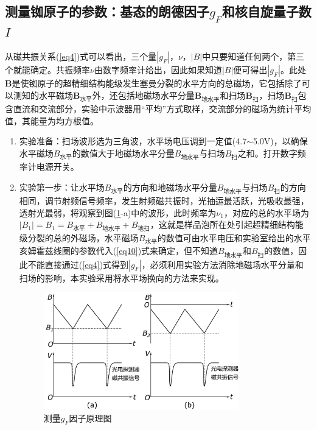 \documentclass[a4paper]{article}
\begin{document}
\subsection{测量铷原子的参数：基态的朗德因子$g_F$和核自旋量子数$I$}
从磁共振关系(\ref{eq4})式可以看出，三个量$|g_F|$，$\nu$，$|B|$中只要知道任何两个，第三个就能确定。共振频率$\nu$由数字频率计给出，因此如果知道$|B|$便可得出$|g_F|$。此处$\bm{B}$是使铷原子的超精细结构能级发生塞曼分裂的水平方向的总磁场，它包括除了可以测知的水平磁场$\bm{B}_{\text{水平}}$外，还包括地磁场水平分量$\bm{B}_{\text{地水平}}$和扫场$\bm{B}_{\text{扫}}$，扫场$\bm{B}_{\text{扫}}$包含直流和交流部分，实验中示波器用“平均”方式取样，交流部分的磁场为统计平均值，其能量为均方根值。
\begin{enumerate}
\item 实验准备：扫场波形选为三角波，水平场电压调到一定值(4.7$\sim$5.0V)，以确保水平磁场$B_{\text{水平}}$的数值大于地磁场水平分量$B_{\text{地水平}}$与扫场$B_{\text{扫}}$之和。打开数字频率计电源开关。
\item 实验第一步：让水平场$B_{\text{水平}}$的方向和地磁场水平分量$B_{\text{地水平}}$与扫场$B_{\text{扫}}$的方向相同，调节射频信号频率，发生射频磁共振时，光抽运最活跃，光吸收最强，透射光最弱，将观察到图(\ref{fig5}-a)中的波形，此时频率为$\nu_1$，对应的总的水平场为$|B_1| = B_1 = B_{\text{水平}} + B_{\text{地水平}} + B_{\text{地扫}}$，这就是样品泡所在处引起超精细结构能级分裂的总的外磁场，水平磁场$B_{\text{水平}}$的数值可由水平电压和实验室给出的水平亥姆霍兹线圈的参数代入(\ref{eq10})式来确定，但不知道$B_{\text{地水平}}$和$B_{\text{扫}}$的数值，因此不能直接通过(\ref{eq4})式得到$|g_F|$，必须利用实验方法消除地磁场水平分量和扫场的影响，本实验采用将水平场换向的方法来实现。
\begin{figure}[!h]
\centering
\includegraphics[width=0.8\textwidth]{fig/fig5.pdf}
\caption{测量$g_F$因子原理图}\label{fig5}
\end{figure}

\end{enumerate}
\end{document}
